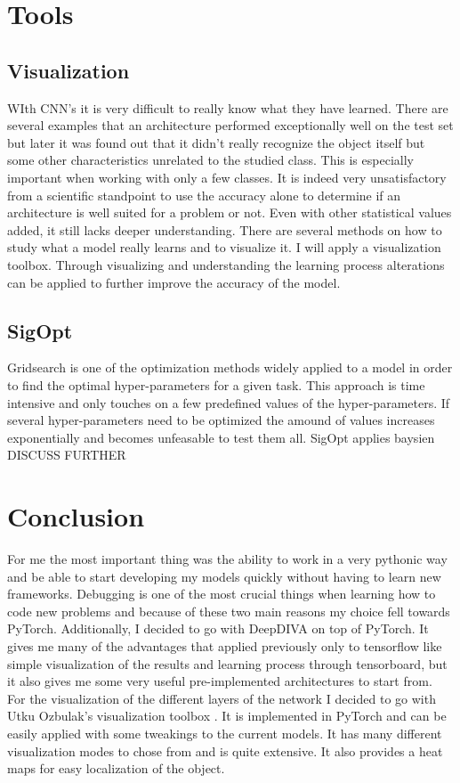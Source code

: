 \section{Tools}

\subsection{Visualization}

WIth CNN's it is very difficult to really know what they have learned. There are several examples that an architecture performed exceptionally well on the test set but later it was found out that it didn't really recognize the object itself but some other characteristics unrelated to the studied class. This is especially important when working with only a few classes. It is indeed very unsatisfactory from a scientific standpoint to use the accuracy alone to determine if an architecture is well suited for a problem or not. Even with other statistical values added, it still lacks deeper understanding. There are several methods on how to study what a model really learns and to visualize it. I will apply a visualization toolbox. Through visualizing and understanding the learning process alterations can be applied to further improve the accuracy of the model.

\subsection{SigOpt}

Gridsearch is one of the optimization methods widely applied to a model in order to find the optimal hyper-parameters for a given task. This approach is time intensive and only touches on a few predefined values of the hyper-parameters. If several hyper-parameters need to be optimized the amound of values increases exponentially and becomes unfeasable to test them all. SigOpt applies baysien DISCUSS FURTHER

\section{Conclusion}

For me the most important thing was the ability to work in a very pythonic way and be able to start developing my models quickly without having to learn new frameworks. Debugging is one of the most crucial things when learning how to code new problems and because of these two main reasons my choice fell towards PyTorch. Additionally, I decided to go with DeepDIVA on top of PyTorch. It gives me many of the advantages that applied previously only to tensorflow like simple visualization of the results and learning process through tensorboard, but it also gives me some very useful pre-implemented architectures to start from. \\

For the visualization of the different layers of the network I decided to go with Utku Ozbulak's visualization toolbox \cite{viztoolbox}. It is implemented in PyTorch and can be easily applied with some tweakings to the current models. It has many different visualization modes to chose from and is quite extensive. It also provides a heat maps for easy localization of the object.